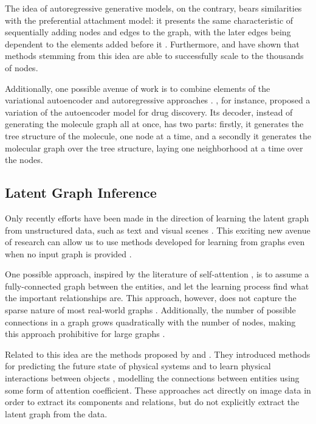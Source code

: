 \documentclass[12pt,a4paper]{article}
\begin{document}
	The idea of autoregressive generative models, on the contrary, bears similarities with the preferential attachment model: it presents the same characteristic of sequentially adding nodes and edges to the graph, with the later edges being dependent to the elements added before it \citep{Li2018, You2018, Liao2019}. Furthermore, \textcite{You2018} and \textcite{Liao2019} have shown that methods stemming from this idea are able to successfully scale to the thousands of nodes.
	
	Additionally, one possible avenue of work is to combine elements of the variational autoencoder and autoregressive approaches \citep{Hamilton2020}. \textcite{Jin2018}, for instance, proposed a variation of the autoencoder model for drug discovery. Its decoder, instead of generating the molecule graph all at once, has two parts: firstly, it generates the tree structure of the molecule, one node at a time, and a secondly it generates the molecular graph over the tree structure, laying one neighborhood at a time over the nodes.

	\subsection{Latent Graph Inference}
	\label{sec:latent_graph_inference}
	
	Only recently efforts have been made in the direction of learning the latent graph from unstructured data, such as text and visual scenes \citep{Vaswani2017, Wang2018, Watters2017, VanSteenkiste2018, KipfNRI2018}. This exciting new avenue of research can allow us to use methods developed for learning from graphs even when no input graph is provided \citep{Hamilton2020}.
	
	One possible approach, inspired by the literature of self-attention \citep{Vaswani2017}, is to assume a fully-connected graph between the entities, and let the learning process find what the important relationships are. This approach, however, does not capture the sparse nature of most real-world graphs \citep{Newman2019}. Additionally, the number of possible connections in a graph grows quadratically with the number of nodes, making this approach prohibitive for large graphs \citep{Battaglia2018}.
	
	Related to this idea are the methods proposed by \textcite{Watters2017} and \textcite{VanSteenkiste2018}. They introduced methods for predicting the future state of physical systems \citep{Watters2017} and to learn physical interactions between objects \citep{VanSteenkiste2018}, modelling the connections between entities using some form of attention coefficient. These approaches act directly on image data in order to extract its components and relations, but do not explicitly extract the latent graph from the data.
	
\end{document}
